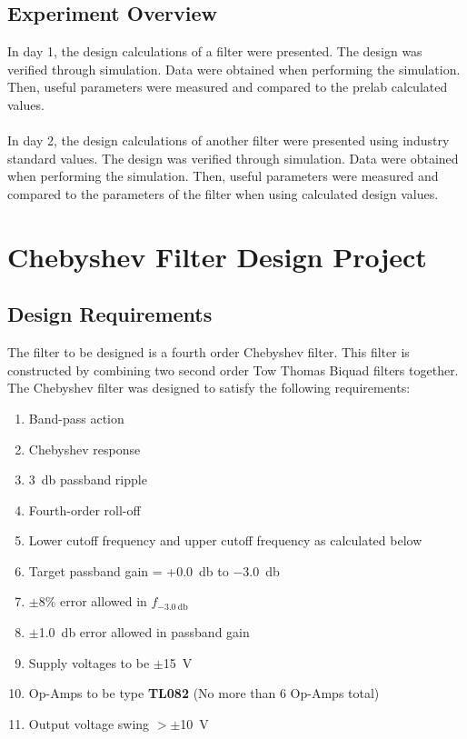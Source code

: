 \documentclass[hidelinks]{article}
\begin{document}
	\subsection{Experiment Overview}
	In day 1, the design calculations of a filter were presented. 
	The design was verified through simulation.
	Data were obtained when performing the simulation.
	Then, useful parameters were measured and compared to the prelab calculated values.\\\\
	In day 2, the design calculations of another filter were presented using industry standard values. 
	The design was verified through simulation.
	Data were obtained when performing the simulation.
	Then, useful parameters were measured and compared to the parameters of the filter when using calculated design values.
	\pagebreak
	\section{Chebyshev Filter Design Project}
	\subsection{Design Requirements}
	The filter to be designed is a fourth order Chebyshev filter.
	This filter is constructed by combining two second order Tow Thomas Biquad filters together.\\
	The Chebyshev filter was designed to satisfy the following requirements:
	\begin{enumerate}
		\item Band-pass action
		\item Chebyshev response
		\item \SI{3}{\decibel} passband ripple
		\item Fourth-order roll-off
		\item Lower cutoff frequency and upper cutoff frequency as calculated below
		\item Target passband gain = +\SI{0.0}{\decibel} to \SI{-3.0}{\decibel}
		\item $\pm$8\% error allowed in $f_{\SI{-3.0}{\decibel}}$
		\item $\pm$\SI{1.0}{\decibel} error allowed in passband gain
		\item Supply voltages to be $\pm$\SI{15}{\volt}
		\item Op-Amps to be type \textbf{TL082} (No more than 6 Op-Amps total)
		\item Output voltage swing $>\pm$\SI{10}{\volt}
	\end{enumerate}
\end{document}
